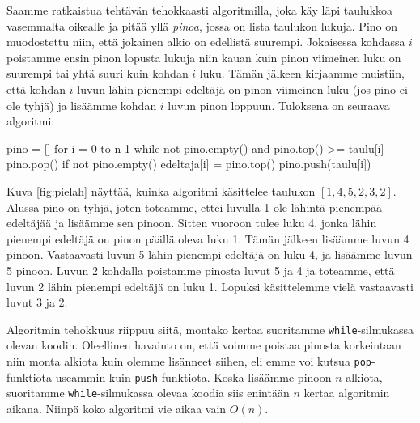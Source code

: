 
Saamme ratkaistua tehtävän tehokkaasti algoritmilla,
joka käy läpi taulukkoa vasemmalta oikealle ja pitää yllä \emph{pinoa},
jossa on lista taulukon lukuja.
Pino on muodostettu niin, että jokainen alkio on edellistä suurempi.
Jokaisessa kohdassa $i$ poistamme ensin pinon lopusta lukuja
niin kauan kuin pinon viimeinen luku on suurempi tai yhtä
suuri kuin kohdan $i$ luku.
Tämän jälkeen kirjaamme muistiin, että kohdan $i$ luvun
lähin pienempi edeltäjä on pinon viimeinen luku (jos pino ei ole tyhjä) ja
lisäämme kohdan $i$ luvun pinon loppuun.
Tuloksena on seuraava algoritmi:

\begin{code}
pino = []
for i = 0 to n-1
    while not pino.empty() and pino.top() >= taulu[i]
        pino.pop()
    if not pino.empty()
        edeltaja[i] = pino.top()
    pino.push(taulu[i])
\end{code}

Kuva \ref{fig:pielah} näyttää, kuinka algoritmi käsittelee taulukon $[1,4,5,2,3,2]$.
Alussa pino on tyhjä, joten toteamme, ettei luvulla 1
ole lähintä pienempää edeltäjää ja lisäämme sen pinoon.
Sitten vuoroon tulee luku 4, jonka lähin pienempi edeltäjä
on pinon päällä oleva luku 1. Tämän jälkeen lisäämme luvun 4 pinoon.
Vastaavasti luvun 5 lähin pienempi edeltäjä on luku 4,
ja lisäämme luvun 5 pinoon.
Luvun 2 kohdalla poistamme pinosta luvut 5 ja 4
ja toteamme, että luvun 2 lähin pienempi edeltäjä on luku 1.
Lopuksi käsittelemme vielä vastaavasti luvut 3 ja 2.

Algoritmin tehokkuus riippuu siitä, montako kertaa suoritamme
\texttt{while}-silmukassa olevan koodin.
Oleellinen havainto on, että voimme poistaa pinosta
korkeintaan niin monta alkiota kuin olemme lisänneet siihen,
eli emme voi kutsua \texttt{pop}-funktiota useammin kuin \texttt{push}-funktiota.
Koska lisäämme pinoon $n$ alkiota, suoritamme \texttt{while}-silmukassa
olevaa koodia siis enintään $n$ kertaa algoritmin aikana.
Niinpä koko algoritmi vie aikaa vain $O(n)$.
